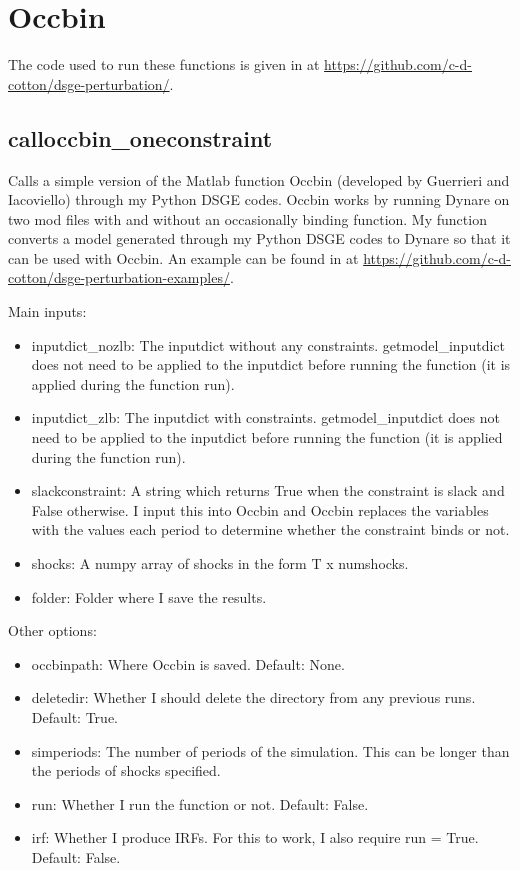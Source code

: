 \documentclass{article}
\theoremstyle{definition}
\begin{document}
\section{Occbin}
The code used to run these functions is given in  at \url{https://github.com/c-d-cotton/dsge-perturbation/}.

\subsection{calloccbin\_oneconstraint}
Calls a simple version of the Matlab function Occbin (developed by Guerrieri and Iacoviello) through my Python DSGE codes. Occbin works by running Dynare on two mod files with and without an occasionally binding function. My function converts a model generated through my Python DSGE codes to Dynare so that it can be used with Occbin. An example can be found in  at \url{https://github.com/c-d-cotton/dsge-perturbation-examples/}.

Main inputs:
\begin{itemize}
    \item inputdict\_nozlb: The inputdict without any constraints. getmodel\_inputdict does not need to be applied to the inputdict before running the function (it is applied during the function run).
    \item inputdict\_zlb: The inputdict with constraints. getmodel\_inputdict does not need to be applied to the inputdict before running the function (it is applied during the function run).
    \item slackconstraint: A string which returns True when the constraint is slack and False otherwise. I input this into Occbin and Occbin replaces the variables with the values each period to determine whether the constraint binds or not.
    \item shocks: A numpy array of shocks in the form T x numshocks.
    \item folder: Folder where I save the results.
\end{itemize}

Other options:
\begin{itemize}
    \item occbinpath: Where Occbin is saved. Default: None.
    \item deletedir: Whether I should delete the directory from any previous runs. Default: True.
    \item simperiods: The number of periods of the simulation. This can be longer than the periods of shocks specified.
    \item run: Whether I run the function or not. Default: False.
    \item irf: Whether I produce IRFs. For this to work, I also require run = True. Default: False.
\end{itemize}
\end{document}
